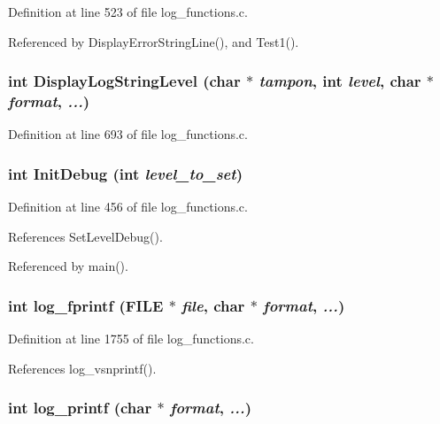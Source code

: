 Definition at line 523 of file log\_\-functions.c.

Referenced by Display\-Error\-String\-Line(), and Test1().
\subsubsection{\setlength{\rightskip}{0pt plus 5cm}int Display\-Log\-String\-Level (char $\ast$ {\em tampon}, int {\em level}, char $\ast$ {\em format},  {\em ...})}\label{log__functions_8c_a75}




Definition at line 693 of file log\_\-functions.c.
\subsubsection{\setlength{\rightskip}{0pt plus 5cm}int Init\-Debug (int {\em level\_\-to\_\-set})}\label{log__functions_8c_a63}




Definition at line 456 of file log\_\-functions.c.

References Set\-Level\-Debug().

Referenced by main().
\subsubsection{\setlength{\rightskip}{0pt plus 5cm}int log\_\-fprintf (FILE $\ast$ {\em file}, char $\ast$ {\em format},  {\em ...})}\label{log__functions_8c_a97}




Definition at line 1755 of file log\_\-functions.c.

References log\_\-vsnprintf().
\subsubsection{\setlength{\rightskip}{0pt plus 5cm}int log\_\-printf (char $\ast$ {\em format},  {\em ...})}\label{log__functions_8c_a99}




